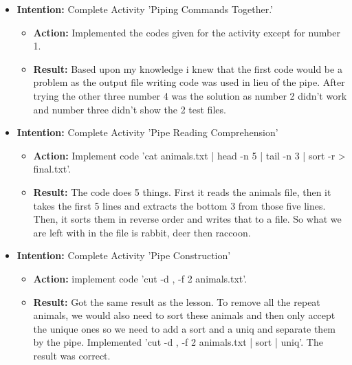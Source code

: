 \documentclass{article}
\begin{document}
\begin{itemize}
\begin{itemize}
\end{itemize}

\item{\textbf{Intention:} Complete Activity 'Piping Commands Together.'}

\begin{itemize}
\item{\textbf{Action:} Implemented the codes given for the activity except for number 1.}

\item{\textbf{Result:} Based upon my knowledge i knew that the first code would be a problem as the output file writing code was used in lieu of the pipe. After trying the other three number 4 was the solution as number 2 didn't work and number three didn't show the 2 test files.}

\end{itemize}

\item{\textbf{Intention:} Complete Activity 'Pipe Reading Comprehension'}

\begin{itemize}
\item{\textbf{Action:} Implement code 'cat animals.txt | head -n 5 | tail -n 3 | sort -r > final.txt'.}

\item{\textbf{Result:} The code does 5 things. First it reads the animals file, then it takes the first 5 lines and extracts the bottom 3 from those five lines. Then, it sorts them in reverse order and writes that to a file. So what we are left with in the file is rabbit, deer then raccoon.}

\end{itemize}

\item{\textbf{Intention:} Complete Activity 'Pipe Construction'}

\begin{itemize}
\item{\textbf{Action:} implement code 'cut -d , -f 2 animals.txt'.}

\item{\textbf{Result:} Got the same result as the lesson. To remove all the repeat animals, we would also need to sort these animals and then only accept the unique ones so we need to add a sort and a uniq and separate them by the pipe. Implemented 'cut -d , -f 2 animals.txt | sort | uniq'. The result was correct.}

\end{itemize}


\end{itemize}
\end{document}
